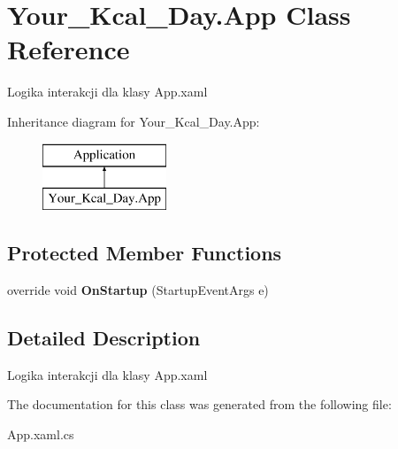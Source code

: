\hypertarget{class_your___kcal___day_1_1_app}{}\section{Your\+\_\+\+Kcal\+\_\+\+Day.\+App Class Reference}
\label{class_your___kcal___day_1_1_app}


Logika interakcji dla klasy App.\+xaml  


Inheritance diagram for Your\+\_\+\+Kcal\+\_\+\+Day.\+App\+:\begin{figure}[H]
\begin{center}
\leavevmode
\includegraphics[height=2.000000cm]{class_your___kcal___day_1_1_app}
\end{center}
\end{figure}
\subsection*{Protected Member Functions}
\begin{DoxyCompactItemize}
\item 
\mbox{\label{class_your___kcal___day_1_1_app_a1dc2954227b29141869106394913538a}} 
override void {\bfseries On\+Startup} (Startup\+Event\+Args e)
\end{DoxyCompactItemize}


\subsection{Detailed Description}
Logika interakcji dla klasy App.\+xaml 



The documentation for this class was generated from the following file\+:\begin{DoxyCompactItemize}
\item 
App.\+xaml.\+cs\end{DoxyCompactItemize}
